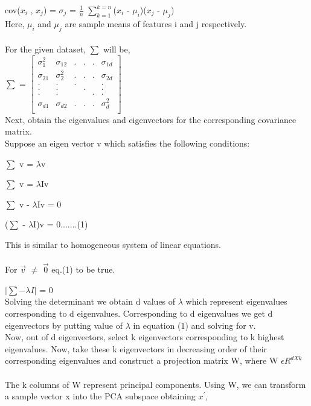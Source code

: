 \documentclass{article}
\begin{document}
\begin{itemize}
\begin{itemize}
        cov($x_{i}$ , $x_j$) = $\sigma_{j}$ = $\frac{1}{n}$ $\sum_{k=1}^{k=n}$($x_{i}$ - $\mu_{i}$)($x_{j}$ - $\mu_{j}$)
        \\Here, $\mu_{i}$ and $\mu_{j}$ are sample means of features i and j respectively.
        \\ \\For the given dataset, $\sum$ will be,
        \\$\sum$ =  $\begin{bmatrix} 
        \sigma_{1}^{2} & \sigma_{12} & . & . & . & \sigma_{1d} \\
        \sigma_{21} & \sigma_{2}^{2} & . & . & . & \sigma_{2d} \\
        . & . & . &   &   & . \\
        . & . &   & . &   & . \\
        . & . &   &   & . & . \\
        \sigma_{d1} & \sigma_{d2} & . & . & . & \sigma_{d}^{2} \\
        \end{bmatrix}
        $
        \\Next, obtain the eigenvalues and eigenvectors for the corresponding covariance matrix.
        \\Suppose an eigen vector v which satisfies the following conditions:
        
        $\sum$ v = $\lambda$v
        
        $\sum$ v = $\lambda$Iv
        
        $\sum$ v - $\lambda$Iv = 0
        
        ($\sum$ - $\lambda$I)v = 0.......(1)
        
        This is similar to homogeneous system of linear equations.
        \\ \\For $\Vec{v}$ $\neq$ $\Vec{0}$ eq.(1) to be true.
        
        $|{\sum - \lambda I}|$ = 0
        \\Solving the determinant we obtain d values of $\lambda$ which represent eigenvalues corresponding to d eigenvalues. Corresponding to d eigenvalues we get d eigenvectors by putting value of $\lambda$ in equation (1) and solving for v.
        \\Now, out of d eigenvectors, select k eigenvectors corresponding to k highest eigenvalues. Now, take these k eigenvectors in decreasing order of their corresponding eigenvalues and construct a projection matrix W, where W $\epsilon R^{dXk}$
        \\ \\The k columns of W represent principal components. Using W, we can transform a sample vector x into the PCA subspace obtaining $x^{'}$,
        

\end{itemize}
\end{itemize}
\end{document}
